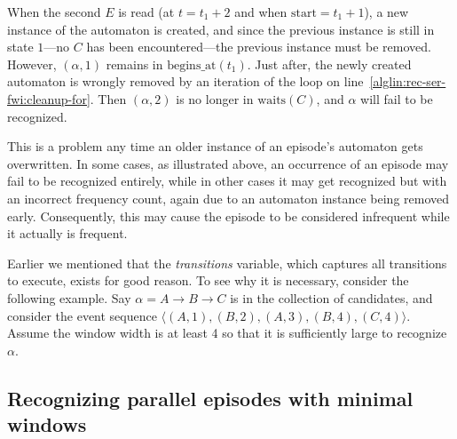 When the second $ E $ is read (at $ t = t_1 + 2 $ and when $ \text{start} = t_1 + 1 $), a new instance of the automaton is created, and since the previous instance is still in state $ 1 $---no $ C $ has been encountered---the previous instance must be removed. However, $ (\alpha, 1) $ remains in $ \text{begins\_at}(t_1) $. Just after, the newly created automaton is wrongly removed by an iteration of the loop on line~\ref{alglin:rec-ser-fwi:cleanup-for}. Then $ (\alpha, 2) $ is no longer in $ \text{waits}(C) $, and $ \alpha $ will fail to be recognized.

This is a problem any time an older instance of an episode's automaton gets overwritten. In some cases, as illustrated above, an occurrence of an episode may fail to be recognized entirely, while in other cases it may get recognized but with an incorrect frequency count, again due to an automaton instance being removed early. Consequently, this may cause the episode to be considered infrequent while it actually is frequent.

Earlier we mentioned that the \emph{transitions} variable, which captures all transitions to execute, exists for good reason. To see why it is necessary, consider the following example. Say $ \alpha = A \to B \to C $ is in the collection of candidates, and consider the event sequence $ \langle (A, 1), (B, 2), (A, 3), (B, 4), (C, 4) \rangle $. Assume the window width is at least 4 so that it is sufficiently large to recognize $ \alpha $.


\subsection{Recognizing parallel episodes with minimal windows}

